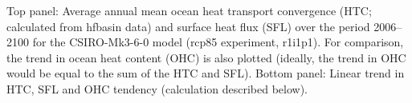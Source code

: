 \label{fig:csiro}
Top panel: Average annual mean ocean heat transport convergence (HTC; calculated from hfbasin data) and surface heat flux (SFL) over the period 2006--2100 for the CSIRO-Mk3-6-0 model (rcp85 experiment, r1i1p1). For comparison, the trend in ocean heat content (OHC) is also plotted (ideally, the trend in OHC would be equal to the sum of the HTC and SFL). Bottom panel: Linear trend in HTC, SFL and OHC tendency (calculation described below).
